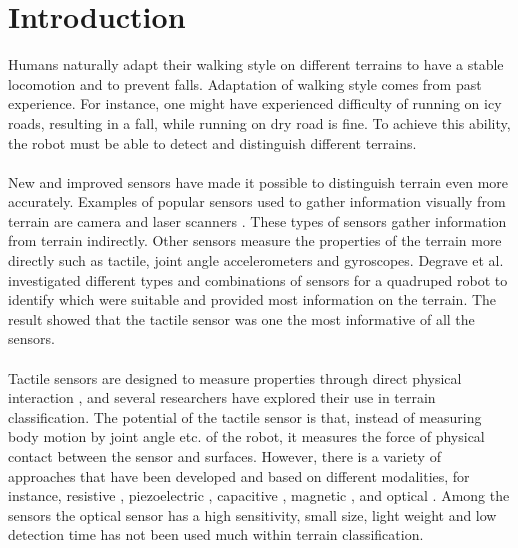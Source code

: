 \documentclass[USenglish]{ifimaster}  %
\begin{document}
\chapter{Introduction}                  %
Humans naturally adapt their walking style on different terrains to have a stable locomotion and to prevent falls. Adaptation of walking style comes from past experience. For instance, one might have experienced difficulty of running on icy roads, resulting in a fall, while running on dry road is fine. To achieve this ability, the robot must be able to detect and distinguish different terrains.
\\
\\ 
New and improved sensors have made it possible to distinguish terrain even more accurately. Examples of popular sensors used to gather information visually from terrain are camera \cite{littleDog} and laser scanners \cite{4651026}. These types of sensors gather information from terrain indirectly. Other sensors measure the properties of the terrain more directly such as tactile, joint angle accelerometers and gyroscopes. Degrave et al.\cite{6784609} investigated different types and combinations of sensors for a quadruped robot to identify which were suitable and provided most information on the terrain. The result showed that the tactile sensor was one the most informative of all the sensors. 
\\
\\
Tactile sensors are designed to measure properties through direct physical interaction \cite{Cutkosky2008}, and several researchers  \cite{6784609,ROB:ROB20332,5752869,6584154}have explored their use in terrain classification. The potential of the tactile sensor is that, instead of measuring body motion by joint angle etc. of the robot, it measures the force of physical contact  between the sensor and surfaces. However, there is a variety of approaches that have been developed and based on different modalities, for instance, resistive \cite{928844,4276807,Wisitsoraat200717,351572}, piezoelectric  \cite{4200745,1331377}, capacitive \cite{99980,554353}, magnetic \cite{Chi2004172}, and optical \cite{220165,20431,Nicholls1990,1545264,1381228,7559098,Heo2006312}. Among the sensors the optical sensor has a high sensitivity, small size, light weight and low detection time \cite{Dutta2016} has not been used much within terrain classification.
\\
\\
\end{document}
